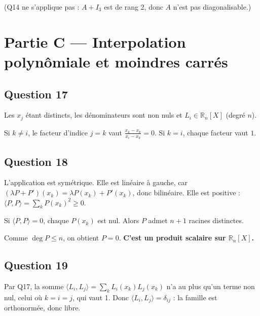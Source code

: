 \documentclass[11pt,a4paper]{article}
\newcommand{\equationajustee}[1]{%
  \sbox{\boiteequation}{$\displaystyle #1$}%
  \ifdim\wd\boiteequation>\linewidth
    \[\resizebox{\linewidth}{!}{\usebox{\boiteequation}}\]%
  \else
    \[#1\]%
  \fi}
\begin{document}
(Q14 ne s'applique pas : \(A+I_3\) est de rang 2, donc \(A\) n'est pas diagonalisable.)

\hypertarget{partie-c-interpolation-polynuxf4miale-et-moindres-carruxe9s}{%
\section{Partie C --- Interpolation polynômiale et moindres carrés}\label{partie-c-interpolation-polynuxf4miale-et-moindres-carruxe9s}}

\hypertarget{question-17}{%
\subsection{Question 17}\label{question-17}}

Les \(x_j\) étant distincts, les dénominateurs sont non nuls et \(L_i\in\mathbb R_n[X]\) (degré \(n\)).

Si \(k\neq i\), le facteur d'indice \(j=k\) vaut \(\frac{x_k-x_k}{x_i-x_k}=0\). Si \(k=i\), chaque facteur vaut \(1\).
\equationajustee{\boxed{L_i(x_k)=\begin{cases}1&\text{si }k=i\\0&\text{sinon.}\end{cases}}}

\hypertarget{question-18}{%
\subsection{Question 18}\label{question-18}}

L'application est symétrique. Elle est linéaire à gauche, car \((\lambda P+P')(x_k)=\lambda P(x_k)+P'(x_k)\), donc bilinéaire. Elle est positive : \(\langle P,P\rangle=\sum_kP(x_k)^2\geqslant0\).

Si \(\langle P,P\rangle=0\), chaque \(P(x_k)\) est nul. Alors \(P\) admet \(n+1\) racines distinctes.

Comme \(\deg P\leqslant n\), on obtient \(P=0\). \textbf{C'est un produit scalaire sur \(\mathbb R_n[X]\).}

\hypertarget{question-19}{%
\subsection{Question 19}\label{question-19}}

Par Q17, la somme \(\langle L_i,L_j\rangle=\sum_kL_i(x_k)L_j(x_k)\) n'a au plus qu'un terme non nul, celui où \(k=i=j\), qui vaut 1. Donc \(\langle L_i,L_j\rangle=\delta_{ij}\) : la famille est orthonormée, donc libre.
\end{document}
